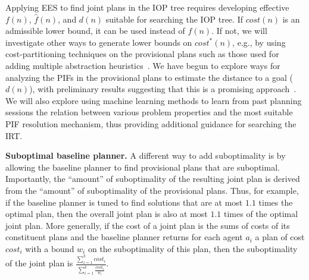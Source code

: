 \documentclass[11pt]{article}
\begin{document}
Applying EES to find joint plans in the IOP tree requires developing effective $f(n)$, $\hat{f}(n)$, and $d(n)$ suitable for searching the IOP tree. If $cost(n)$ is an admissible lower bound, it can be used instead of $f(n)$. If not, we will investigate other ways to generate lower bounds on $cost^*(n)$, e.g., by using cost-partitioning techniques on the provisional plans such as those used for adding multiple abstraction heuristics~\cite{katz2010optimal}. We have begun to explore ways for analyzing the PIFs in the provisional plans to estimate the distance to a goal ($d(n)$), with preliminary results suggesting that this is a promising approach~\cite{barer2014suboptimal-socs}. We will also explore using machine learning methods to learn from past planning sessions the relation between various problem properties and the most suitable PIF resolution mechanism, thus providing additional guidance for searching the IRT. 



{\bf Suboptimal baseline planner.} 
A different way to add suboptimality is by allowing the baseline planner to find provisional plans that are suboptimal. Importantly, the ``amount'' of suboptimality of the resulting joint plan is derived from the ``amount'' of suboptimality of the provisional plans. Thus, for example, if the baseline planner is tuned to find solutions that are at most $1.1$ times the optimal plan, then the overall joint plan is also at most $1.1$ times of the optimal joint plan. More generally, if the cost of a joint plan is the sums of costs of its constituent plans and the baseline planner returns for each agent $a_i$ a plan of cost $cost_i$ with a bound $w_i$ on the suboptimality of this plan, then the suboptimality of the joint plan is $\frac{\sum_{i=1}^k cost_i}{\sum_{i=1}^k \frac{cost_i}{w_i}}$.  
\end{document}
